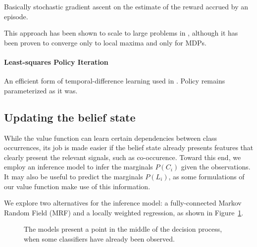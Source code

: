 \documentclass[runningheads]{llncs}
\begin{document}
Basically stochastic gradient ascent on the estimate of the reward accrued by an episode.

This approach has been shown to scale to large problems in \cite{Branavan2009,Sutton2000}, although it has been proven to converge only to local maxima and only for MDPs.


\paragraph{Least-squares Policy Iteration}
An efficient form of temporal-difference learning used in \cite{Kwok2004}.
Policy remains parameterized as it was.

\subsection{Updating the belief state}
While the value function can learn certain dependencies between class occurrences, its job is made easier if the belief state already presents features that clearly present the relevant signals, such as co-occurence.
Toward this end, we employ an inference model to infer the marginals $P(C_i)$ given the observations.
It may also be useful to predict the marginals $P(L_i)$, as some formulations of our value function make use of this information.

We explore two alternatives for the inference model: a fully-connected Markov Random Field (MRF) and a locally weighted regression, as shown in Figure~\ref{fig:models}.

\begin{figure}[h!]
\centering
{} \hfill
{}
\caption{The models present a point in the middle of the decision process, when some classifiers have already been observed.}
\label{fig:models}
\end{figure}
\end{document}

